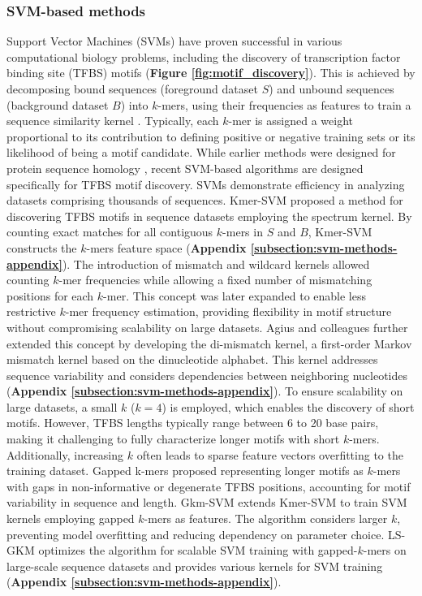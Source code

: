 \documentclass[a4paper, titlepage, openright]{book}
\begin{document}
\subsubsection{SVM-based methods}
Support Vector Machines (SVMs) \citep{boser1992training} have proven successful in various computational biology problems, including the discovery of transcription factor binding site (TFBS) motifs (\textbf{Figure \ref{fig:motif_discovery}}). This is achieved by decomposing bound sequences (foreground dataset $S$) and unbound sequences (background dataset $B$) into $k$-mers, using their frequencies as features to train a sequence similarity kernel \citep{ben2008support}. Typically, each $k$-mer is assigned a weight proportional to its contribution to defining positive or negative training sets or its likelihood of being a motif candidate. While earlier methods were designed for protein sequence homology \citep{leslie2001spectrum,eskin2002mismatch,kuang2005profile}, recent SVM-based algorithms are designed specifically for TFBS motif discovery. SVMs demonstrate efficiency in analyzing datasets comprising thousands of sequences. Kmer-SVM \citep{lee2011discriminative,fletez2013kmer} proposed a method for discovering TFBS motifs in sequence datasets employing the spectrum kernel. By counting exact matches for all contiguous $k$-mers in $S$ and $B$, Kmer-SVM constructs the $k$-mers feature space (\textbf{Appendix \ref{subsection:svm-methods-appendix}}). The introduction of mismatch \citep{kuang2005profile} and wildcard \citep{leslie2003fast} kernels allowed counting $k$-mer frequencies while allowing a fixed number of mismatching positions for each $k$-mer. This concept was later expanded to enable less restrictive $k$-mer frequency estimation, providing flexibility in motif structure without compromising scalability on large datasets. Agius and colleagues \citep{agius2010high} further extended this concept by developing the di-mismatch kernel, a first-order Markov mismatch kernel based on the dinucleotide alphabet. This kernel addresses sequence variability and considers dependencies between neighboring nucleotides (\textbf{Appendix \ref{subsection:svm-methods-appendix}}). To ensure scalability on large datasets, a small $k$ ($k=4$) is employed, which enables the discovery of short motifs. However, TFBS lengths typically range between 6 to 20 base pairs, making it challenging to fully characterize longer motifs with short $k$-mers. Additionally, increasing $k$ often leads to sparse feature vectors overfitting to the training dataset. Gapped k-mers \citep{ghandi2014robust} proposed representing longer motifs as $k$-mers with gaps in non-informative or degenerate TFBS positions, accounting for motif variability in sequence and length. Gkm-SVM \citep{ghandi2014enhanced,ghandi2016gkmsvm} extends Kmer-SVM to train SVM kernels employing gapped $k$-mers as features. The algorithm considers larger $k$, preventing model overfitting and reducing dependency on parameter choice. LS-GKM \citep{lee2016ls} optimizes the algorithm for scalable SVM training with gapped-$k$-mers on large-scale sequence datasets and provides various kernels for SVM training (\textbf{Appendix \ref{subsection:svm-methods-appendix}}).
\end{document}

